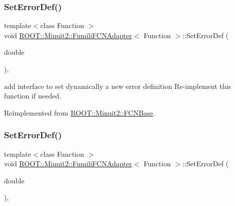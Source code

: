 \mbox{\label{classROOT_1_1Minuit2_1_1FumiliFCNAdapter_a4c854e9ce5324ee557f818ecf5f00fb1}} 
\subsubsection{\texorpdfstring{SetErrorDef()}{SetErrorDef()}\hspace{0.1cm}{\footnotesize\ttfamily [1/2]}}
{\footnotesize\ttfamily template$<$class Function $>$ \\
void \mbox{\hyperlink{classROOT_1_1Minuit2_1_1FumiliFCNAdapter}{R\+O\+O\+T\+::\+Minuit2\+::\+Fumili\+F\+C\+N\+Adapter}}$<$ Function $>$\+::Set\+Error\+Def (\begin{DoxyParamCaption}\item[{double}]{ }\end{DoxyParamCaption})\hspace{0.3cm}{\ttfamily [inline]}, {\ttfamily [virtual]}}

add interface to set dynamically a new error definition Re-\/implement this function if needed. 

Reimplemented from \mbox{\hyperlink{classROOT_1_1Minuit2_1_1FCNBase_a840e02c2e6ef96eec289deca096b6088}{R\+O\+O\+T\+::\+Minuit2\+::\+F\+C\+N\+Base}}.

\mbox{\label{classROOT_1_1Minuit2_1_1FumiliFCNAdapter_a4c854e9ce5324ee557f818ecf5f00fb1}} 
\subsubsection{\texorpdfstring{SetErrorDef()}{SetErrorDef()}\hspace{0.1cm}{\footnotesize\ttfamily [2/2]}}
{\footnotesize\ttfamily template$<$class Function $>$ \\
void \mbox{\hyperlink{classROOT_1_1Minuit2_1_1FumiliFCNAdapter}{R\+O\+O\+T\+::\+Minuit2\+::\+Fumili\+F\+C\+N\+Adapter}}$<$ Function $>$\+::Set\+Error\+Def (\begin{DoxyParamCaption}\item[{double}]{ }\end{DoxyParamCaption})\hspace{0.3cm}{\ttfamily [inline]}, {\ttfamily [virtual]}}

